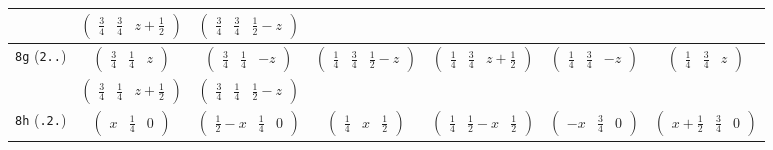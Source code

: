 \documentclass[fleqn,9pt,landscape]{jsarticle}
\begin{document}
\begin{center}
\begin{longtable}{ccccccc}
& $ \begin{pmatrix} \frac{3}{4} & \frac{3}{4} & z + \frac{1}{2} \end{pmatrix} $ & $ \begin{pmatrix} \frac{3}{4} & \frac{3}{4} & \frac{1}{2} - z \end{pmatrix} $ & $  $ & $  $ & $  $ & $  $ \\ \hline
{\tt 8g} ({\tt 2..}) & $ \begin{pmatrix} \frac{3}{4} & \frac{1}{4} & z \end{pmatrix} $ & $ \begin{pmatrix} \frac{3}{4} & \frac{1}{4} & - z \end{pmatrix} $ & $ \begin{pmatrix} \frac{1}{4} & \frac{3}{4} & \frac{1}{2} - z \end{pmatrix} $ & $ \begin{pmatrix} \frac{1}{4} & \frac{3}{4} & z + \frac{1}{2} \end{pmatrix} $ & $ \begin{pmatrix} \frac{1}{4} & \frac{3}{4} & - z \end{pmatrix} $ & $ \begin{pmatrix} \frac{1}{4} & \frac{3}{4} & z \end{pmatrix} $ \\
& $ \begin{pmatrix} \frac{3}{4} & \frac{1}{4} & z + \frac{1}{2} \end{pmatrix} $ & $ \begin{pmatrix} \frac{3}{4} & \frac{1}{4} & \frac{1}{2} - z \end{pmatrix} $ & $  $ & $  $ & $  $ & $  $ \\ \hline
{\tt 8h} ({\tt .2.}) & $ \begin{pmatrix} x & \frac{1}{4} & 0 \end{pmatrix} $ & $ \begin{pmatrix} \frac{1}{2} - x & \frac{1}{4} & 0 \end{pmatrix} $ & $ \begin{pmatrix} \frac{1}{4} & x & \frac{1}{2} \end{pmatrix} $ & $ \begin{pmatrix} \frac{1}{4} & \frac{1}{2} - x & \frac{1}{2} \end{pmatrix} $ & $ \begin{pmatrix} - x & \frac{3}{4} & 0 \end{pmatrix} $ & $ \begin{pmatrix} x + \frac{1}{2} & \frac{3}{4} & 0 \end{pmatrix} $ \\

\end{longtable}
\end{center}
\end{document}
